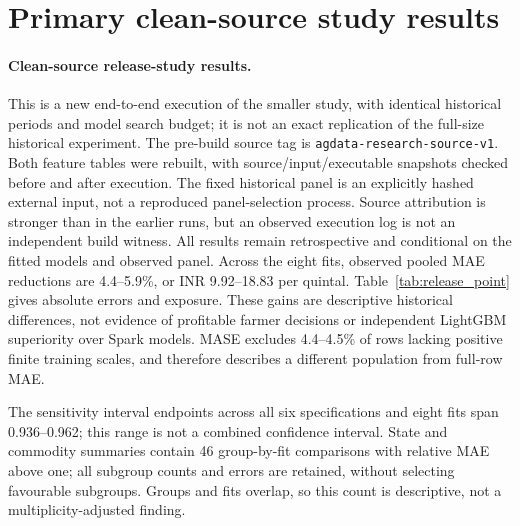 \section{Primary clean-source study results}\label{sec:point}
\paragraph{Clean-source release-study results.}
This is a new end-to-end execution of the smaller study, with identical historical periods and model search budget; it is not an exact replication of the full-size historical experiment. The pre-build source tag is \texttt{agdata-research-source-v1}. Both feature tables were rebuilt, with source/input/executable snapshots checked before and after execution. The fixed historical panel is an explicitly hashed external input, not a reproduced panel-selection process. Source attribution is stronger than in the earlier runs, but an observed execution log is not an independent build witness. All results remain retrospective and conditional on the fitted models and observed panel.
Across the eight fits, observed pooled MAE reductions are 4.4--5.9\%, or INR 9.92--18.83 per quintal. Table~\ref{tab:release_point} gives absolute errors and exposure. These gains are descriptive historical differences, not evidence of profitable farmer decisions or independent LightGBM superiority over Spark models. MASE excludes 4.4--4.5\% of rows lacking positive finite training scales, and therefore describes a different population from full-row MAE.

\begin{table}[!t]\centering\small\setlength{\tabcolsep}{3pt}
\caption{Clean-source release study: candidate/persistence MAE in INR per quintal, forecast rows, calendar days and MASE-excluded rows. Forecast rows are not independent replicates.}\label{tab:release_point}

\end{table}

\begin{table}[!t]\centering\small\setlength{\tabcolsep}{3pt}
\caption{Circular-block relative-MAE percentile sensitivity intervals (2,000 replicates, nominal 95\%). Actual coverage is unvalidated; all block specifications are shown.}\label{tab:release_circular}

\end{table}

\begin{table}[!t]\centering\small\setlength{\tabcolsep}{3pt}
\caption{Non-circular-block sensitivity intervals under the same settings. Long blocks leave few temporal spans and do not establish stationarity or future transportability.}\label{tab:release_noncircular}

\end{table}
The sensitivity interval endpoints across all six specifications and eight fits span 0.936--0.962; this range is not a combined confidence interval. State and commodity summaries contain 46 group-by-fit comparisons with relative MAE above one; all subgroup counts and errors are retained, without selecting favourable subgroups. Groups and fits overlap, so this count is descriptive, not a multiplicity-adjusted finding.


